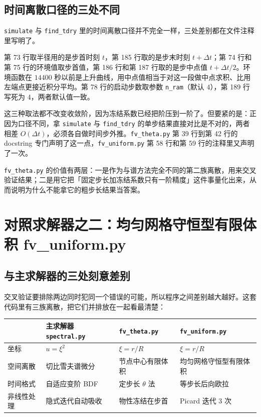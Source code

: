 \subsection{时间离散口径的三处不同}

\texttt{simulate} 与 \texttt{find\_tdry} 里的时间离散口径并不完全一样，三处差别都在文件注释里写明了。

第 73 行取半径用的是步首时刻 $t$，第 185 行取的是步末时刻 $t+\Delta t$；第 74 行和第 75 行的环境值取步首值，第 186 行和第 187 行取的是步中点值 $t+\Delta t/2$。环境函数在 $14400$ 秒以前是上升曲线，用中点值相当于对这一段做中点求积、比用左端点更接近积分平均。第 78 行的启动步数取参数 \texttt{n\_ram}（默认 $4$），第 189 行写死为 $4$，两者默认值一致。

这三种取法都不改变收敛阶，因为冻结系数已经把阶压到一阶了。但要紧的是：正因为口径不同，拿 \texttt{simulate} 与 \texttt{find\_tdry} 的单步结果直接对比是不对的，两者相差 $O(\Delta t)$，必须各自做时间步外推。\texttt{fv\_theta.py} 第 39 行到第 42 行的 docstring 专门声明了这一点，\texttt{fv\_uniform.py} 第 58 行和第 59 行的注释里又声明了一次。

\keypoint
\texttt{fv\_theta.py} 的价值有两层：一是作为与谱方法完全不同的第二族离散，用来交叉验证结果；二是用它把「固定步长加冻结系数只有一阶精度」这件事量化出来，从而说明为什么不能拿它的粗步长结果当答案。

\section{对照求解器之二：均匀网格守恒型有限体积 fv\_uniform.py}

\subsection{与主求解器的三处刻意差别}

交叉验证要排除两边同时犯同一个错误的可能，所以程序之间差别越大越好。这套代码里有三族离散，把它们并排放在一起看最清楚：

\begin{center}
\begin{tabular}{@{}llll@{}}
\toprule
 & 主求解器 \texttt{spectral.py} & \texttt{fv\_theta.py} & \texttt{fv\_uniform.py} \\
\midrule
坐标 & $u=\xi^2$ & $\xi=r/R$ & $\xi=r/R$ \\
空间离散 & 切比雪夫谱微分 & 节点中心有限体积 & 均匀网格守恒型有限体积 \\
时间格式 & 自适应变阶 BDF & 定步长 $\theta$ 法 & 等步长后向欧拉 \\
非线性处理 & 隐式迭代自动吸收 & 物性冻结在步首 & Picard 迭代 $3$ 次 \\
\bottomrule
\end{tabular}
\end{center}


